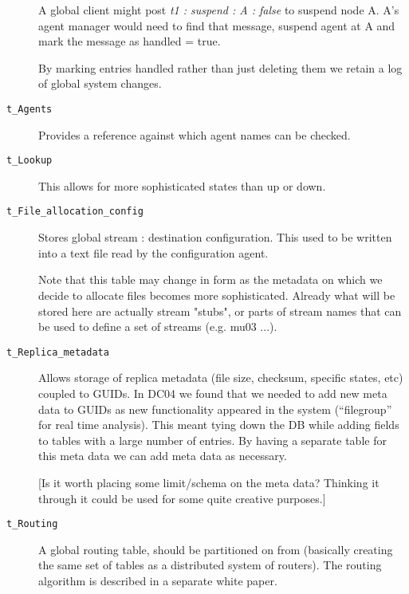 \documentclass{cmspaper}
\begin{document}
\begin{description}
    A global client might post {\em t1 : suspend : A : false} to suspend
    node A.  A's agent manager would need to find that message, suspend
    agent at A and mark the message as handled = true.

    By marking entries handled rather than just deleting them we
    retain a log of global system changes.

  \item [\texttt{t\_Agents}]\mbox{}

    Provides a reference against which agent names can be checked.

  \item [\texttt{t\_Lookup}]\mbox{}

    This allows for more sophisticated states than up or down.

  \item [\texttt{t\_File\_allocation\_config}]\mbox{}

    Stores global stream : destination configuration.  This used to be
    written into a text file read by the configuration agent.
    
    Note that this table may change in form as the metadata on which we
    decide to allocate files becomes more sophisticated. Already what will
    be stored here are actually stream "stubs", or parts of stream names
    that can be used to define a set of streams (e.g. mu03 ...).

  \item [\texttt{t\_Replica\_metadata}]\mbox{}

    Allows storage of replica metadata (file size, checksum, specific
    states, etc) coupled to GUIDs.  In DC04 we found that we needed to
    add new meta data to GUIDs as new functionality appeared in the
    system (``filegroup'' for real time analysis).  This meant tying
    down the DB while adding fields to tables with a large number of
    entries.  By having a separate table for this meta data we can add
    meta data as necessary.

    [Is it worth placing some limit/schema on the meta data?  Thinking
    it through it could be used for some quite creative purposes.]

  \item [\texttt{t\_Routing}]\mbox{}

    A global routing table, should be partitioned on from (basically
    creating the same set of tables as a distributed system of
    routers).  The routing algorithm is described in a separate white paper.
\end{description}
\end{document}

